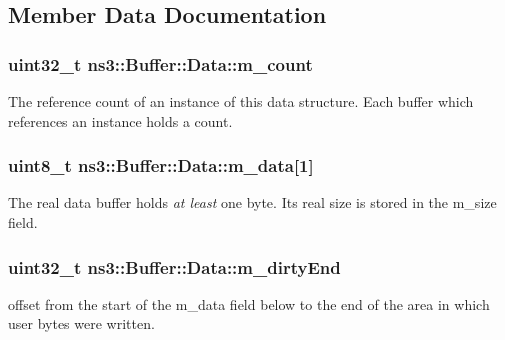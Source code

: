 \subsection{Member Data Documentation}
\subsubsection[{\texorpdfstring{m\+\_\+count}{m_count}}]{\setlength{\rightskip}{0pt plus 5cm}uint32\+\_\+t ns3\+::\+Buffer\+::\+Data\+::m\+\_\+count}\hypertarget{structns3_1_1Buffer_1_1Data_a9d2c411830a0a352108f900e19f0728e}{}\label{structns3_1_1Buffer_1_1Data_a9d2c411830a0a352108f900e19f0728e}
The reference count of an instance of this data structure. Each buffer which references an instance holds a count. 
\subsubsection[{\texorpdfstring{m\+\_\+data}{m_data}}]{\setlength{\rightskip}{0pt plus 5cm}uint8\+\_\+t ns3\+::\+Buffer\+::\+Data\+::m\+\_\+data\mbox{[}1\mbox{]}}\hypertarget{structns3_1_1Buffer_1_1Data_a29e7d0a3b4e7e8272d06eb8c8e51ed04}{}\label{structns3_1_1Buffer_1_1Data_a29e7d0a3b4e7e8272d06eb8c8e51ed04}
The real data buffer holds {\itshape at least} one byte. Its real size is stored in the m\+\_\+size field. 
\subsubsection[{\texorpdfstring{m\+\_\+dirty\+End}{m_dirtyEnd}}]{\setlength{\rightskip}{0pt plus 5cm}uint32\+\_\+t ns3\+::\+Buffer\+::\+Data\+::m\+\_\+dirty\+End}\hypertarget{structns3_1_1Buffer_1_1Data_a76ba53202d79de545e0000aab663cb54}{}\label{structns3_1_1Buffer_1_1Data_a76ba53202d79de545e0000aab663cb54}
offset from the start of the m\+\_\+data field below to the end of the area in which user bytes were written. 
